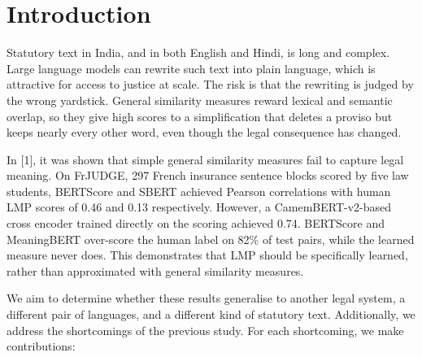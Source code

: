 \documentclass[conference]{IEEEtran}
\begin{document}
\section{Introduction}

Statutory text in India, and in both English and Hindi, is long and complex. Large language models can rewrite such text into plain language, which is attractive for access to justice at scale. The risk is that the rewriting is judged by the wrong yardstick. General similarity measures reward lexical and semantic overlap, so they give high scores to a simplification that deletes a proviso but keeps nearly every other word, even though the legal consequence has changed.

In [1], it was shown that simple general similarity measures fail to capture legal meaning. On FrJUDGE, 297 French insurance sentence blocks scored by five law students, BERTScore and SBERT achieved Pearson correlations with human LMP scores of 0.46 and 0.13 respectively. However, a CamemBERT-v2-based cross encoder trained directly on the scoring achieved 0.74. BERTScore and MeaningBERT over-score the human label on 82\% of test pairs, while the learned measure never does. This demonstrates that LMP should be specifically learned, rather than approximated with general similarity measures.

We aim to determine whether these results generalise to another legal system, a different pair of languages, and a different kind of statutory text. Additionally, we address the shortcomings of the previous study. For each shortcoming, we make contributions:
\end{document}
